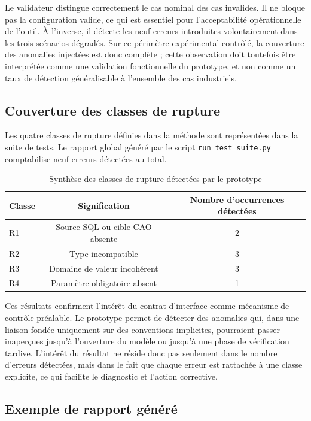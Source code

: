 Le validateur distingue correctement le cas nominal des cas invalides. Il ne bloque pas la configuration valide, ce qui est essentiel pour l'acceptabilité opérationnelle de l'outil. À l'inverse, il détecte les neuf erreurs introduites volontairement dans les trois scénarios dégradés. Sur ce périmètre expérimental contrôlé, la couverture des anomalies injectées est donc complète ; cette observation doit toutefois être interprétée comme une validation fonctionnelle du prototype, et non comme un taux de détection généralisable à l'ensemble des cas industriels.

\subsection{Couverture des classes de rupture}

Les quatre classes de rupture définies dans la méthode sont représentées dans la suite de tests. Le rapport global généré par le script \texttt{run\_test\_suite.py} comptabilise neuf erreurs détectées au total.

\begin{table}[H]
\centering
\caption{Synthèse des classes de rupture détectées par le prototype}
\label{tab:classes-detectees}
\begin{tabular}{lcc}
\toprule
Classe & Signification & Nombre d'occurrences détectées \\
\midrule
R1 & Source SQL ou cible CAO absente & 2 \\
R2 & Type incompatible & 3 \\
R3 & Domaine de valeur incohérent & 3 \\
R4 & Paramètre obligatoire absent & 1 \\
\bottomrule
\end{tabular}
\end{table}

Ces résultats confirment l'intérêt du contrat d'interface comme mécanisme de contrôle préalable. Le prototype permet de détecter des anomalies qui, dans une liaison fondée uniquement sur des conventions implicites, pourraient passer inaperçues jusqu'à l'ouverture du modèle ou jusqu'à une phase de vérification tardive. L'intérêt du résultat ne réside donc pas seulement dans le nombre d'erreurs détectées, mais dans le fait que chaque erreur est rattachée à une classe explicite, ce qui facilite le diagnostic et l'action corrective.

\subsection{Exemple de rapport généré}

